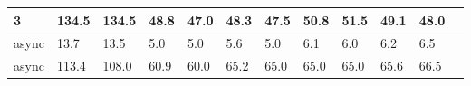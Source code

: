 \documentclass[a4paper]{report}
\begin{document}
\begin{table}[h]
\begin{tabular}{|l|l|l|l|l|l|l|l|l|l|l|l|}
		3                        & 134.5                              & 134.5                           & 48.8                        & 47.0                      & 48.3                           & 47.5   & 50.8 & 51.5   & 49.1 & 48.0   \\ \hline
		async                    & 13.7                               & 13.5                            & 5.0                         & 5.0                       & 5.6                            & 5.0    & 6.1  & 6.0    & 6.2  & 6.5    \\ \hline
		async                    & 113.4                              & 108.0                           & 60.9                        & 60.0                      & 65.2                           & 65.0   & 65.0 & 65.0   & 65.6 & 66.5   \\ \hline
	\end{tabular}
\end{table}
\end{document}
